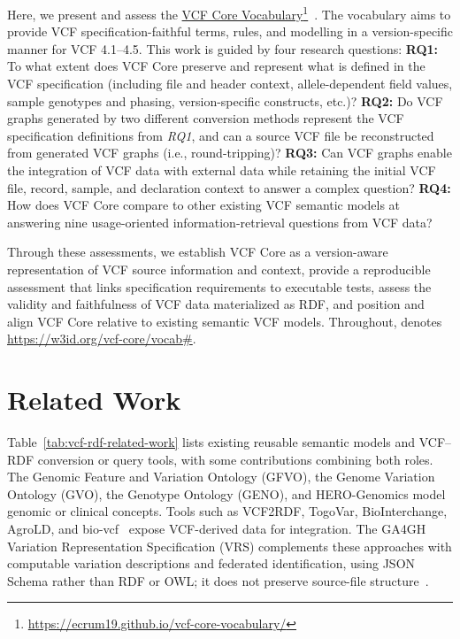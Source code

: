 Here, we present and assess the \href{https://ecrum19.github.io/vcf-core-vocabulary/}{VCF Core Vocabulary}\footnote{\url{https://ecrum19.github.io/vcf-core-vocabulary/}}~\cite{vcfc210}.
The vocabulary aims to provide VCF specification-faithful terms, rules, and modelling in a version-specific manner for VCF 4.1--4.5.
This work is guided by four research questions:
\textbf{RQ1:} To what extent does VCF Core preserve and represent what is defined in the VCF specification (including file and header context, allele-dependent field values, sample genotypes and phasing, version-specific constructs, etc.)?
\textbf{RQ2:} Do VCF graphs generated by two different conversion methods represent the VCF specification definitions from \textit{RQ1}, and can a source VCF file be reconstructed from generated VCF graphs (i.e., round-tripping)?
\textbf{RQ3:} Can VCF graphs enable the integration of VCF data with external data while retaining the initial VCF file, record, sample, and declaration context to answer a complex question?
\textbf{RQ4:} How does VCF Core compare to other existing VCF semantic models at answering nine usage-oriented information-retrieval questions from VCF data?

Through these assessments, we establish VCF Core as a version-aware representation of VCF source information and context, provide a reproducible assessment that links specification requirements to executable tests, assess the validity and faithfulness of VCF data materialized as RDF, and position and align VCF Core relative to existing semantic VCF models.
Throughout,  denotes \url{https://w3id.org/vcf-core/vocab#}.


\section{Related Work}
Table~\ref{tab:vcf-rdf-related-work} lists existing reusable semantic models and VCF--RDF conversion or query tools, with some contributions combining both roles.
The Genomic Feature and Variation Ontology (GFVO), the Genome Variation Ontology (GVO), the Genotype Ontology (GENO), and HERO-Genomics model genomic or clinical concepts.
Tools such as VCF2RDF, TogoVar, BioInterchange, AgroLD, and bio-vcf~\cite{garrison2022vcflib} expose VCF-derived data for integration.
The GA4GH Variation Representation Specification (VRS) complements these approaches with computable variation descriptions and federated identification, using JSON Schema rather than RDF or OWL; it does not preserve source-file structure~\cite{wagner2021vrs}.

